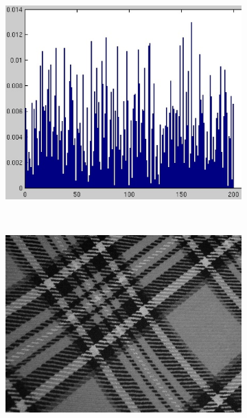 \documentclass[10pt,twocolumn,letterpaper]{article}
\begin{document}
\begin{figure}
\begin{subfigure}[b]{0.2\textwidth}
        \includegraphics[width=\textwidth]{T18_H01.eps}
    \end{subfigure}
    \\ 
    \begin{subfigure}[b]{0.2\textwidth}
        \includegraphics[width=\textwidth]{T25_01.jpg}
    \end{subfigure}
    ~ 
    \begin{subfigure}[b]{0.2\textwidth}

\end{subfigure}
\end{figure}
\end{document}
